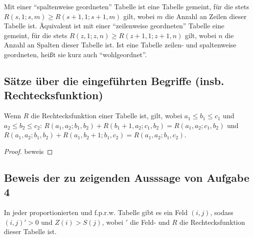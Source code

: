 \begin{definition}
    Mit einer "`spaltenweise geordneten"' Tabelle ist eine Tabelle gemeint, für die stets $R(s, 1; s, m)\geq 
    R(s+1, 1; s+1, m)$ gilt, wobei $m$ die Anzahl an Zeilen dieser Tabelle ist. Äquivalent ist mit einer 
    "`zeilenweise geordneten"' Tabelle eine gemeint, für die stets $R(z, 1; z, n)\geq R(z+1, 1; z+1, n)$ gilt, 
    wobei $n$ die Anzahl an Spalten dieser Tabelle ist. Ist eine Tabelle zeilen- und spaltenweise geordneten, heißt 
    sie kurz auch "`wohlgeordnet"'.
\end{definition}

\subsection*{Sätze über die eingeführten Begriffe (insb. Rechtecksfunktion)}

\begin{thm}\label{r_summe}
    Wenn $R$ die Rechtecksfunktion einer Tabelle ist, gilt, wobei $a_1\leq b_1\leq c_1$ und $a_2\leq b_2\leq c_2$: 
    $R(a_1, a_2; b_1, b_2)+R(b_1+1, a_2; c_1, b_2)=R(a_1, a_2; c_1, b_2)$ und 
    $R(a_1, a_2; b_1, b_2)+R(a_1, b_2+1; b_1, c_2)=R(a_1, a_2; b_1, c_2)$.
\end{thm}
\begin{proof}
    beweis
\end{proof}

\subsection*{Beweis der zu zeigenden Ausssage von Aufgabe 4}

\begin{thm}\label{haupt4}
    In jeder proportionierten und f.p.r.w. Tabelle gibt es ein Feld $(i, j)$, sodass $(i, j)'>0$ und $Z(i) > S(j)$, 
    wobei $'$ die Feld- und $R$ die Rechtecksfunktion dieser Tabelle ist.
\end{thm}

